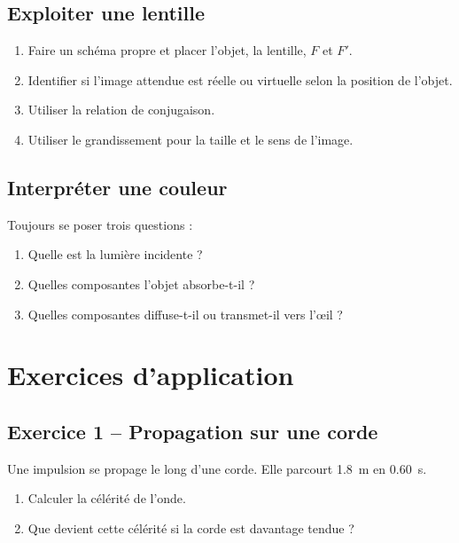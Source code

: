 \documentclass[11pt,a4paper]{article}
\begin{document}
\subsection{Exploiter une lentille}
\begin{methode}
\begin{enumerate}
    \item Faire un schéma propre et placer l'objet, la lentille, $F$ et $F'$.
    \item Identifier si l'image attendue est réelle ou virtuelle selon la position de l'objet.
    \item Utiliser la relation de conjugaison.
    \item Utiliser le grandissement pour la taille et le sens de l'image.
\end{enumerate}
\end{methode}

\subsection{Interpréter une couleur}
\begin{methode}
Toujours se poser trois questions :
\begin{enumerate}
    \item Quelle est la lumière incidente ?
    \item Quelles composantes l'objet absorbe-t-il ?
    \item Quelles composantes diffuse-t-il ou transmet-il vers l'œil ?
\end{enumerate}
\end{methode}

\section{Exercices d'application}

\subsection*{Exercice 1 -- Propagation sur une corde}
Une impulsion se propage le long d'une corde. Elle parcourt \SI{1,8}{m} en \SI{0,60}{s}.
\begin{enumerate}[label=\alph*)]
    \item Calculer la célérité de l'onde.
    \item Que devient cette célérité si la corde est davantage tendue ?
\end{enumerate}
\end{document}
